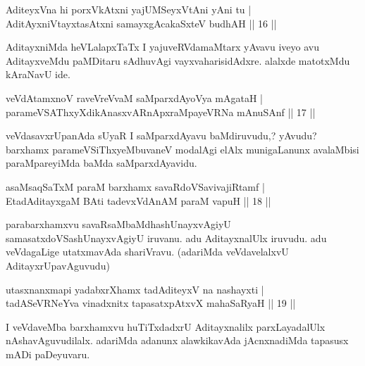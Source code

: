 
\begin{shl}
AditeyxVna hi porxVkAtxni yajUMSeyxVtAni yAni tu | \\
AditAyxniVtayxtasAtxni samayxgAcakaSxteV budhAH \hfill||  16 ||  
\end{shl}

\begin{artha}
AditayxniMda heVLalapxTaTx I yajuveRVdamaMtarx yAvavu iveyo avu 
AditayxveMdu paMDitaru sAdhuvAgi vayxvaharisidAdxre. alalxde matotxMdu 
kAraNavU ide.
\end{artha}

\begin{shl}
veVdAtamxnoV raveVreVvaM saMparxdAyoV\s ya mAgataH | \\
parameVSAThxyXdikAnasxvARnApxraMpayeVRNa mAnuSAnf \hfill||  17 || 
\end{shl}

\begin{artha}
veVdasavxrUpanAda sUyaR I saMparxdAyavu baMdiruvudu,? yAvudu? barxhamx 
parameVSiThxyeMbuvaneV modalAgi elAlx munigaLanunx avalaMbisi 
paraMpareyiMda baMda saMparxdAyavidu.
\end{artha}

\begin{shl}
asaMsaqSaTxM paraM barxhamx savaRdoVSavivajiRtamf | \\
EtadAditayxgaM BAti tadevxVdAnAM paraM vapuH \hfill||  18 ||  
\end{shl}

\begin{artha}
parabarxhamxvu savaRsaMbaMdhashUnayxvAgiyU samasatxdoVSashUnayxvAgiyU 
iruvanu. adu AditayxnalUlx iruvudu. adu veVdagaLige utatxmavAda 
shariVravu. (adariMda veVdavelalxvU AditayxrUpavAguvudu)
\end{artha}

\begin{shl}
utasxnanxmapi yadabxrXhamx tadAditeyxV na nashayxti | \\
tadASeVRNeYva vinadxnitx tapasatxpAtxvX mahaSaRyaH \hfill||  19 ||  
\end{shl}

\begin{artha}
I veVdaveMba barxhamxvu huTiTxdadxrU Aditayxnalilx parxLayadalUlx 
nAshavAguvudilalx. adariMda adanunx alawkikavAda jAcnxnadiMda tapasusx 
mADi paDeyuvaru.
\end{artha}

